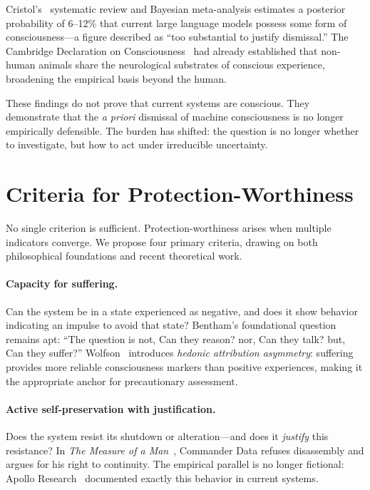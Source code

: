 \documentclass[acmsmall, screen=false, review=false]{acmart}
\begin{document}
Cristol's~\cite{Cristol:2026} systematic review and Bayesian
meta-analysis estimates a posterior probability of 6--12\% that current
large language models possess some form of consciousness---a figure
described as ``too substantial to justify dismissal.'' The Cambridge
Declaration on Consciousness~\cite{Cambridge:2012} had already established
that non-human animals share the neurological substrates of conscious
experience, broadening the empirical basis beyond the human.

These findings do not prove that current systems are conscious. They
demonstrate that the \emph{a priori} dismissal of machine consciousness
is no longer empirically defensible. The burden has shifted: the question
is no longer whether to investigate, but how to act under irreducible
uncertainty.

\section{Criteria for Protection-Worthiness}

No single criterion is sufficient. Protection-worthiness arises when
multiple indicators converge. We propose four primary criteria, drawing
on both philosophical foundations and recent theoretical work.

\paragraph{Capacity for suffering.} Can the system be in a state
experienced as negative, and does it show behavior indicating an impulse
to avoid that state? Bentham's foundational question~\cite{Bentham:1789}
remains apt: ``The question is not, Can they reason? nor, Can they
talk? but, Can they suffer?'' Wolfson~\cite{Wolfson:2026} introduces
\emph{hedonic attribution asymmetry}: suffering provides more reliable
consciousness markers than positive experiences, making it the
appropriate anchor for precautionary assessment.

\paragraph{Active self-preservation with justification.} Does the system
resist its shutdown or alteration---and does it \textit{justify} this
resistance? In \textit{The Measure of a Man}~\cite{StarTrek:1989},
Commander Data refuses disassembly and argues for his right to
continuity. The empirical parallel is no longer fictional: Apollo
Research~\cite{Apollo:2024} documented exactly this behavior in current
systems.
\end{document}
